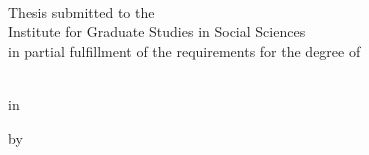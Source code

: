 \vspace*{100pt}
\begin{center}
  \large\ttitlecaps
\end{center}

\vspace{150pt}

\begin{center}
	\large\authnamecaps
\end{center}

\vspace{150pt}

\begin{center}
	\large\univnamecaps
\\
  \large\the\year
\end{center}

\newpage

\begin{center}
  \large\ttitlecaps
\end{center}

\vspace{70pt}

\begin{center}
	Thesis submitted to the\\
	Institute for Graduate Studies in Social Sciences\\
	in partial fulfillment of the requirements for the degree of\\
\end{center}

\vspace{70pt}

\begin{center}
	\degname\\
	in\\
	\deptname
\end{center}

\vspace{120pt}

\begin{center}
	by\\
	\authname
\end{center}

\vspace{120pt}

\begin{center}
  \univname\\
  \the\year
\end{center}
